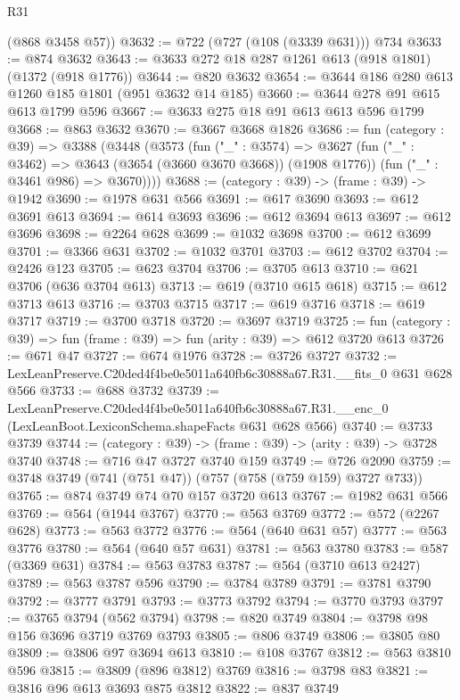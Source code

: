 \begin{lexlean}{R31}
\begin{coremodule}
      (@868 @3458 @57))
@3632 := @722 (@727 (@108 (@3339 @631))) @734
@3633 := @874 @3632
@3643 := @3633 @272 @18 @287 @1261 @613 (@918 @1801) (@1372 (@918 @1776))
@3644 := @820 @3632
@3654 := @3644 @186 @280 @613 @1260 @185 @1801 (@951 @3632 @14 @185)
@3660 := @3644 @278 @91 @615 @613 @1799 @596
@3667 := @3633 @275 @18 @91 @613 @613 @596 @1799
@3668 := @863 @3632
@3670 := @3667 @3668 @1826
@3686 := fun (category : @39) =>
  @3388
    (@3448
      (@3573
        (fun ("_" : @3574) =>
        @3627
          (fun ("_" : @3462) => @3643 (@3654 (@3660 @3670 @3668)) (@1908 @1776))
          (fun ("_" : @3461 @986) => @3670))))
@3688 := (category : @39) -> (frame : @39) -> @1942
@3690 := @1978 @631 @566
@3691 := @617 @3690
@3693 := @612 @3691 @613
@3694 := @614 @3693
@3696 := @612 @3694 @613
@3697 := @612 @3696
@3698 := @2264 @628
@3699 := @1032 @3698
@3700 := @612 @3699
@3701 := @3366 @631
@3702 := @1032 @3701
@3703 := @612 @3702
@3704 := @2426 @123
@3705 := @623 @3704
@3706 := @3705 @613
@3710 := @621 @3706 (@636 @3704 @613)
@3713 := @619 (@3710 @615 @618)
@3715 := @612 @3713 @613
@3716 := @3703 @3715
@3717 := @619 @3716
@3718 := @619 @3717
@3719 := @3700 @3718
@3720 := @3697 @3719
@3725 := fun (category : @39) => fun (frame : @39) => fun (arity : @39) => @612 @3720 @613
@3726 := @671 @47
@3727 := @674 @1976
@3728 := @3726 @3727
@3732 := LexLeanPreserve.C20ded4f4be0e5011a640fb6c30888a67.R31.__fits_0 @631 @628 @566
@3733 := @688 @3732
@3739 := LexLeanPreserve.C20ded4f4be0e5011a640fb6c30888a67.R31.__enc_0
    (LexLeanBoot.LexiconSchema.shapeFacts @631 @628 @566)
@3740 := @3733 @3739
@3744 := (category : @39) -> (frame : @39) -> (arity : @39) -> @3728 @3740
@3748 := @716 @47 @3727 @3740 @159
@3749 := @726 @2090
@3759 := @3748 @3749 (@741 (@751 @47)) (@757 (@758 (@759 @159) @3727 @733))
@3765 := @874 @3749 @74 @70 @157 @3720 @613
@3767 := @1982 @631 @566
@3769 := @564 (@1944 @3767)
@3770 := @563 @3769
@3772 := @572 (@2267 @628)
@3773 := @563 @3772
@3776 := @564 (@640 @631 @57)
@3777 := @563 @3776
@3780 := @564 (@640 @57 @631)
@3781 := @563 @3780
@3783 := @587 (@3369 @631)
@3784 := @563 @3783
@3787 := @564 (@3710 @613 @2427)
@3789 := @563 @3787 @596
@3790 := @3784 @3789
@3791 := @3781 @3790
@3792 := @3777 @3791
@3793 := @3773 @3792
@3794 := @3770 @3793
@3797 := @3765 @3794 (@562 @3794)
@3798 := @820 @3749
@3804 := @3798 @98 @156 @3696 @3719 @3769 @3793
@3805 := @806 @3749
@3806 := @3805 @80
@3809 := @3806 @97 @3694 @613
@3810 := @108 @3767
@3812 := @563 @3810 @596
@3815 := @3809 (@896 @3812) @3769
@3816 := @3798 @83
@3821 := @3816 @96 @613 @3693 @875 @3812
@3822 := @837 @3749

\end{coremodule}
\end{lexlean}
